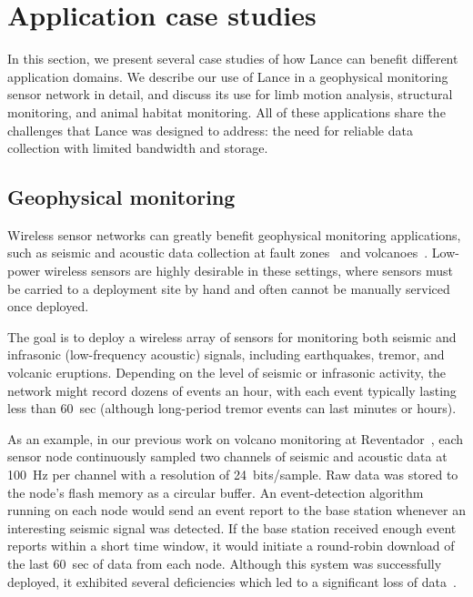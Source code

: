 \section{Application case studies}
\label{sec-applications}
\label{sec-casestudy}

In this section, we present several case studies of how Lance can
benefit different application domains. We describe our use of Lance in
a geophysical monitoring sensor network in detail, and discuss its use for
limb motion analysis, structural monitoring, and animal habitat
monitoring. All of these applications share the challenges that Lance was 
designed to address: the need for reliable data collection with 
limited bandwidth and storage. 

\subsection{Geophysical monitoring}

Wireless sensor networks can greatly benefit geophysical monitoring
applications, such as seismic and acoustic data collection at fault
zones~\cite{ucla-seismic} and volcanoes~\cite{volcano-osdi06}. Low-power
wireless sensors are highly desirable in these settings, where sensors must
be carried to a deployment site by hand and often cannot be manually serviced
once deployed. 

The goal is to deploy a wireless array of sensors for 
monitoring both seismic and infrasonic (low-frequency acoustic)
signals, including earthquakes, tremor, and volcanic eruptions. 
Depending on the level of seismic or infrasonic activity, the network 
might record dozens of events an hour, with each event typically lasting 
less than 60~sec (although long-period tremor events can last minutes 
or hours). 

As an example, in our previous work on volcano monitoring at
Reventador~\cite{volcano-osdi06}, each sensor node continuously sampled two
channels of seismic and acoustic data at 100~Hz per channel with a resolution
of 24~bits/sample. Raw data was stored to the node's flash memory as a
circular buffer.  An event-detection algorithm running on each node would
send an event report to the base station whenever an interesting seismic
signal was detected. If the base station received enough event reports within
a short time window, it would initiate a round-robin download of the last
60~sec of data from each node.  Although this system was successfully
deployed, it exhibited several deficiencies which led to a significant loss
of data~\cite{volcano-osdi06}. 

